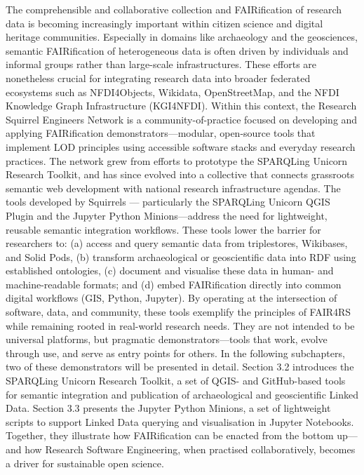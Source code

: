 \documentclass{eceasst}
\begin{document}
The comprehensible and collaborative collection and FAIRification of research data is becoming increasingly important within citizen science and digital heritage communities. Especially in domains like archaeology and the geosciences, semantic FAIRification of heterogeneous data is often driven by individuals and informal groups rather than large-scale infrastructures. These efforts are nonetheless crucial for integrating research data into broader federated ecosystems such as NFDI4Objects, Wikidata, OpenStreetMap, and the NFDI Knowledge Graph Infrastructure (KGI4NFDI). Within this context, the Research Squirrel Engineers Network is a community-of-practice focused on developing and applying FAIRification demonstrators—modular, open-source tools that implement LOD principles using accessible software stacks and everyday research practices. The network grew from efforts to prototype the SPARQLing Unicorn Research Toolkit, and has since evolved into a collective that connects grassroots semantic web development with national research infrastructure agendas. The tools developed by Squirrels — particularly the SPARQLing Unicorn QGIS Plugin and the Jupyter Python Minions—address the need for lightweight, reusable semantic integration workflows. These tools lower the barrier for researchers to: (a) access and query semantic data from triplestores, Wikibases, and Solid Pods, (b) transform archaeological or geoscientific data into RDF using established ontologies, (c) document and visualise these data in human- and machine-readable formats; and (d) embed FAIRification directly into common digital workflows (GIS, Python, Jupyter). By operating at the intersection of software, data, and community, these tools exemplify the principles of FAIR4RS while remaining rooted in real-world research needs. They are not intended to be universal platforms, but pragmatic demonstrators—tools that work, evolve through use, and serve as entry points for others. In the following subchapters, two of these demonstrators will be presented in detail. Section 3.2 introduces the SPARQLing Unicorn Research Toolkit, a set of QGIS- and GitHub-based tools for semantic integration and publication of archaeological and geoscientific Linked Data. Section 3.3 presents the Jupyter Python Minions, a set of lightweight scripts to support Linked Data querying and visualisation in Jupyter Notebooks. Together, they illustrate how FAIRification can be enacted from the bottom up—and how Research Software Engineering, when practised collaboratively, becomes a driver for sustainable open science.
\end{document}
